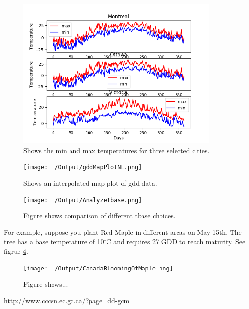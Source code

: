 \documentclass[12pt]{article}
\begin{document}
	\begin{figure}[!htbp]
		\centering
		\includegraphics[width=0.9\textwidth]{./Output/CompareMaxMinTemp.png} 
		\caption{\scriptsize Shows the min and max temperatures for three selected cities.}\label{MinMaxplot}		  
	\end{figure}

	\begin{figure}[!htbp]
		\centering
		\texttt{[image: ./Output/gddMapPlotNL.png]} 
		\caption{\scriptsize Shows an interpolated map plot of gdd data.}\label{gddMapNl}		  
	\end{figure}

	\begin{figure}[!htbp]
		\centering
		\texttt{[image: ./Output/AnalyzeTbase.png]} 
		\caption{\scriptsize Figure shows comparison of different tbase choices.}\label{gddMapNl}		  
	\end{figure}

For example, suppose you plant Red Maple in different areas on May 15th.
The tree has a base temperature of 10${}^\circ$C and requires 27 GDD to reach maturity.
See figrue \ref{gddMapCaMaple}.
	\begin{figure}[!htbp]
		\centering
		\texttt{[image: ./Output/CanadaBloomingOfMaple.png]} 
		\caption{\scriptsize Figure shows...}\label{gddMapCaMaple}		  
	\end{figure}

\pagebreak
\begin{thebibliography}{1}
\url{http://www.cccsn.ec.gc.ca/?page=dd-gcm}
\end{thebibliography}
\end{document}
